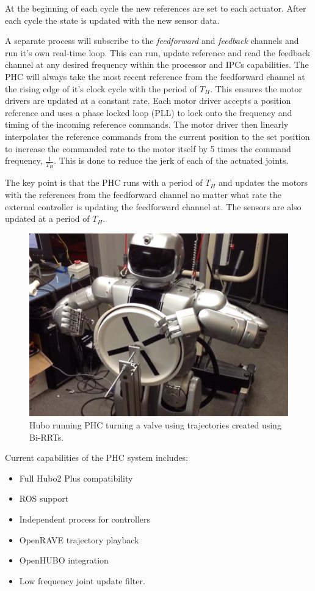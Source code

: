 At the beginning of each cycle the new references are set to each actuator.  
After each cycle the state is updated with the new sensor data.

A separate process will subscribe to the \textit{feedforward} and \textit{feedback} channels and run it's own real-time loop.  
This can run, update reference and read the feedback channel at any desired frequency within the processor and IPCs capabilities.
The PHC will always take the most recent reference from the feedforward channel at the rising edge of it's clock cycle with the period of $T_H$.
This ensures the motor drivers are updated at a constant rate. 
Each motor driver accepts a position reference and uses a phase locked loop (PLL) to lock onto the frequency and timing of the incoming reference commands.
The motor driver then linearly interpolates the reference commands from the current position to the set position to increase the commanded rate to the motor itself by 5 times the command frequency, $\frac{1}{T_H}$.
This is done to reduce the jerk of each of the actuated joints.

The key point is that the PHC runs with a period of $T_H$ and updates the motors with the references from the feedforward channel no matter what rate the external controller is updating the feedforward channel at.  
The sensors are also updated at a period of $T_H$.

\begin{figure}[thpb]
  \centering
\includegraphics[width=1.0\columnwidth]{./pix/hubo_valve.png}
  \caption{Hubo running PHC turning a valve using trajectories created using Bi-RRTs. }
  \label{fig:valve}
\end{figure}

Current capabilities of the PHC system includes:

\begin{itemize}
\item Full Hubo2 Plus compatibility 
\item ROS support
\item Independent process for controllers
\item OpenRAVE trajectory playback
\item OpenHUBO integration 
\item Low frequency joint update filter.
\end{itemize}



